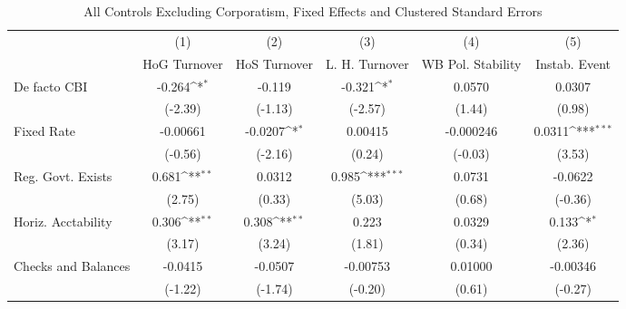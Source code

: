 \begin{table}[htbp]\centering
\def\sym#1{\ifmmode^{#1}\else\(^{#1}\)\fi}
\caption{All Controls Excluding Corporatism, Fixed Effects and Clustered Standard Errors \label{nccmultIndFEDF}}
\begin{tabular}{l*{5}{c}}
\toprule
                                        &\multicolumn{1}{c}{(1)}&\multicolumn{1}{c}{(2)}&\multicolumn{1}{c}{(3)}&\multicolumn{1}{c}{(4)}&\multicolumn{1}{c}{(5)}\\
                                        &\multicolumn{1}{c}{HoG Turnover}&\multicolumn{1}{c}{HoS Turnover}&\multicolumn{1}{c}{L. H. Turnover}&\multicolumn{1}{c}{WB Pol. Stability}&\multicolumn{1}{c}{Instab. Event}\\
\midrule
De facto CBI                            &   -0.264\sym{*}  &   -0.119         &   -0.321\sym{*}  &   0.0570         &   0.0307         \\
                                        &  (-2.39)         &  (-1.13)         &  (-2.57)         &   (1.44)         &   (0.98)         \\
\addlinespace
Fixed Rate                              & -0.00661         &  -0.0207\sym{*}  &  0.00415         &-0.000246         &   0.0311\sym{***}\\
                                        &  (-0.56)         &  (-2.16)         &   (0.24)         &  (-0.03)         &   (3.53)         \\
\addlinespace
Reg. Govt. Exists                       &    0.681\sym{**} &   0.0312         &    0.985\sym{***}&   0.0731         &  -0.0622         \\
                                        &   (2.75)         &   (0.33)         &   (5.03)         &   (0.68)         &  (-0.36)         \\
\addlinespace
Horiz. Acctability                      &    0.306\sym{**} &    0.308\sym{**} &    0.223         &   0.0329         &    0.133\sym{*}  \\
                                        &   (3.17)         &   (3.24)         &   (1.81)         &   (0.34)         &   (2.36)         \\
\addlinespace
Checks and Balances                     &  -0.0415         &  -0.0507         & -0.00753         &  0.01000         & -0.00346         \\
                                        &  (-1.22)         &  (-1.74)         &  (-0.20)         &   (0.61)         &  (-0.27)         \\

\end{tabular}
\end{table}
